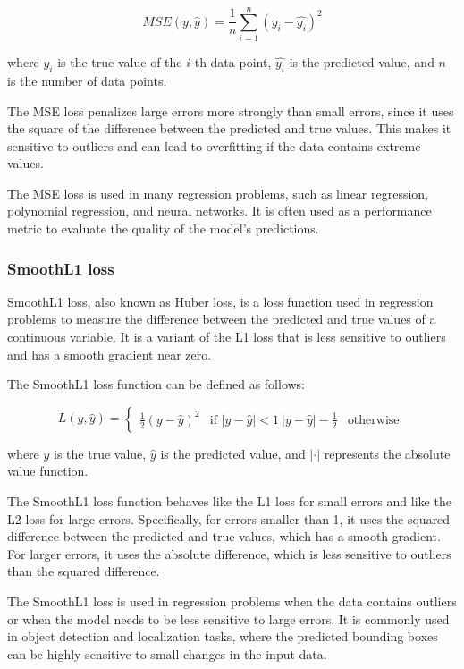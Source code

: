 \begin{equation}
	MSE(y, \hat{y}) = \frac{1}{n}\sum_{i=1}^{n}(y_i - \hat{y_i})^2
\end{equation}

where $y_i$ is the true value of the $i$-th data point, $\hat{y_i}$ is the predicted value, and $n$ is the number of data points.

The MSE loss penalizes large errors more strongly than small errors, since it uses the square of the difference between the predicted and true values. This makes it sensitive to outliers and can lead to overfitting if the data contains extreme values.

The MSE loss is used in many regression problems, such as linear regression, polynomial regression, and neural networks. It is often used as a performance metric to evaluate the quality of the model's predictions.

\subsubsection{SmoothL1 loss}
\label{subsubsec:3_smoothL1_loss}

SmoothL1 loss, also known as Huber loss, is a loss function used in regression problems to measure the difference between the predicted and true values of a continuous variable. It is a variant of the L1 loss that is less sensitive to outliers and has a smooth gradient near zero.

The SmoothL1 loss function can be defined as follows:

\begin{equation}
	L(y, \hat{y}) = \begin{cases}
		\frac{1}{2}(y - \hat{y})^2 & \text{if } |y - \hat{y}| < 1 \
		|y - \hat{y}| - \frac{1}{2} & \text{otherwise} \
	\end{cases}
\end{equation}

where $y$ is the true value, $\hat{y}$ is the predicted value, and $|\cdot|$ represents the absolute value function.

The SmoothL1 loss function behaves like the L1 loss for small errors and like the L2 loss for large errors. Specifically, for errors smaller than 1, it uses the squared difference between the predicted and true values, which has a smooth gradient. For larger errors, it uses the absolute difference, which is less sensitive to outliers than the squared difference.

The SmoothL1 loss is used in regression problems when the data contains outliers or when the model needs to be less sensitive to large errors. It is commonly used in object detection and localization tasks, where the predicted bounding boxes can be highly sensitive to small changes in the input data.

